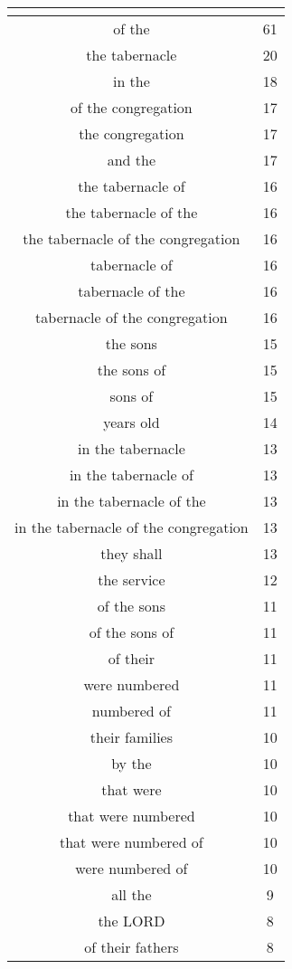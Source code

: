\begin{center}
\begin{longtable}{|c|c|}
\hline \multicolumn{2}{c}{{ }} \\ \hline
\endfoot 
of the & 61\\ \hline 
the tabernacle & 20\\ \hline 
in the & 18\\ \hline 
of the congregation & 17\\ \hline 
the congregation & 17\\ \hline 
and the & 17\\ \hline 
the tabernacle of & 16\\ \hline 
the tabernacle of the & 16\\ \hline 
the tabernacle of the congregation & 16\\ \hline 
tabernacle of & 16\\ \hline 
tabernacle of the & 16\\ \hline 
tabernacle of the congregation & 16\\ \hline 
the sons & 15\\ \hline 
the sons of & 15\\ \hline 
sons of & 15\\ \hline 
years old & 14\\ \hline 
in the tabernacle & 13\\ \hline 
in the tabernacle of & 13\\ \hline 
in the tabernacle of the & 13\\ \hline 
in the tabernacle of the congregation & 13\\ \hline 
they shall & 13\\ \hline 
the service & 12\\ \hline 
of the sons & 11\\ \hline 
of the sons of & 11\\ \hline 
of their & 11\\ \hline 
were numbered & 11\\ \hline 
numbered of & 11\\ \hline 
their families & 10\\ \hline 
by the & 10\\ \hline 
that were & 10\\ \hline 
that were numbered & 10\\ \hline 
that were numbered of & 10\\ \hline 
were numbered of & 10\\ \hline 
all the & 9\\ \hline 
the LORD & 8\\ \hline 
of their fathers & 8\\ \hline 

\end{longtable}
\end{center}
